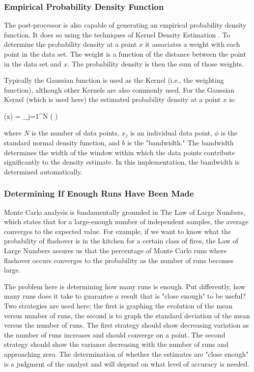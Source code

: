 \documentclass[12pt,twoside]{book}
\begin{document}
\subsubsection{Empirical Probability Density Function}

The post-processor is also capable of generating an empirical probability density function. It does so using the techniques of Kernel Density Estimation \cite{Haste_2009}. To determine the probability density at a point $x$ it associates a weight with each point in the data set. The weight is a function of the distance between the point in the data set and $x$. The probability density is then the sum of those weights.

Typically the Gaussian function is used as the Kernel (i.e., the weighting function), although other Kernels are also commonly used. For the Gaussian Kernel (which is used here) the estimated probability density at a point $x$ is:

\be
(x) = \sum_{j=1}^{N} \phi\left( \right)
\ee

where $N$ is the number of data points, $x_j$ is an individual data point, $\phi$ is the standard normal density function, and $b$ is the "bandwidth." The bandwidth determines the width of the window within which the data points contribute significantly to the density estimate. In this implementation, the bandwidth is determined automatically.

\subsubsection{Determining If Enough Runs Have Been Made}

Monte Carlo analysis is fundamentally grounded in The Law of Large Numbers, which states that for a large-enough number of independent samples, the average converges to the expected value. For example, if we want to know what the probability of flashover is in the kitchen for a certain class of fires, the Law of Large Numbers assures us that the percentage of Monte Carlo runs where flashover occurs converges to the probability as the number of runs becomes large.

The problem here is determining how many runs is enough. Put differently, how many runs does it take to guarantee a result that is "close enough" to be useful? Two strategies are used here; the first is graphing the evolution of the mean versus number of runs, the second is to graph the standard deviation of the mean versus the number of runs. The first strategy should show decreasing variation as the number of runs increases and should converge on a point. The second strategy should show the variance decreasing with the number of runs and approaching zero. The determination of whether the estimates are "close enough" is a judgment of the analyst and will depend on what level of accuracy is needed.
\end{document}
